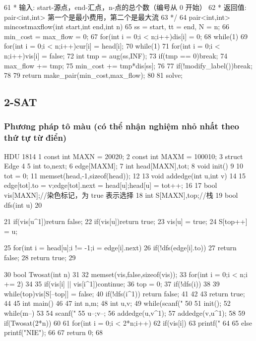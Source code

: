 \documentclass[11pt]{article}
\begin{document}
\begin{Code}
{61       * 输入: start-源点，end-汇点，n-点的总个数（编号从 0 开始）
62       * 返回值: pair<int,int> 第一个是最小费用，第二个是最大流
63       */
64     pair<int,int> mincostmaxflow(int start,int end,int n){
65          ss = start, tt = end, N = n;
66          min_cost = max_flow = 0;
67          for(int i = 0;i < n;i++)dis[i] = 0;
68          while(1){
69              for(int i = 0;i < n;i++)cur[i] = head[i];
70              while(1){
71                  for(int i = 0;i < n;i++)vis[i] = false;
72                  int tmp = aug(ss,INF);
73                  if(tmp == 0)break;
74                  max_flow += tmp;
75                  min_cost += tmp*dis[ss];
76              }
77              if(!modify_label())break;
78          }
79          return make_pair(min_cost,max_flow);
80     }
81 }solve;
\end{Code}

\subsection{2-SAT}

\subsubsection{Phương pháp tô màu (có thể nhận nghiệm nhỏ nhất theo thứ tự từ điển)}

\begin{Code}
     HDU 1814
 1   const int MAXN = 20020;
 2   const int MAXM = 100010;
 3   struct Edge
 4   {
 5       int to,next;
 6   }edge[MAXM];
 7   int head[MAXN],tot;
 8   void init()
 9   {
10       tot = 0;
11       memset(head,-1,sizeof(head));
12   }
13   void addedge(int u,int v)
14   {
15       edge[tot].to = v;edge[tot].next = head[u];head[u] = tot++;
16   }
17   bool vis[MAXN];//染色标记，为 true 表示选择
18   int S[MAXN],top;//栈
19   bool dfs(int u)
20   {
21       if(vis[u^1])return false;
22       if(vis[u])return true;
23       vis[u] = true;
24       S[top++] = u;


25       for(int i = head[u];i != -1;i = edge[i].next)
26           if(!dfs(edge[i].to))
27               return false;
28       return true;
29   }
30   bool Twosat(int n)
31   {
32       memset(vis,false,sizeof(vis));
33       for(int i = 0;i < n;i += 2)
34       {
35           if(vis[i] || vis[i^1])continue;
36           top = 0;
37           if(!dfs(i))
38           {
39                while(top)vis[S[--top]] = false;
40                if(!dfs(i^1)) return false;
41           }
42       }
43       return true;
44   }
45   int main()
46   {
47       int n,m;
48       int u,v;
49       while(scanf("%
50       {
51           init();
52           while(m--)
53           {
54                scanf("%
55                u--;v--;
56                addedge(u,v^1);
57                addedge(v,u^1);
58           }
59           if(Twosat(2*n))
60           {
61                for(int i = 0;i < 2*n;i++)
62                    if(vis[i])
63                       printf("%
64           }
65           else printf("NIE\n");
66       }
67       return 0;
68   }
\end{Code}
\end{document}
